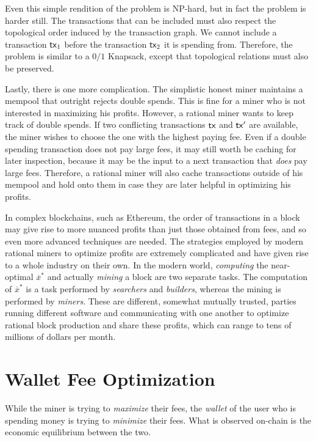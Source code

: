 Even this simple rendition of the problem is NP-hard, but in fact the problem is harder still.
The transactions that can be included must also respect the topological order induced by
the transaction graph. We cannot include a transaction $\mathsf{tx}_1$ before the transaction $\mathsf{tx}_2$
it is spending from. Therefore, the problem is similar to a $0/1$ Knapsack, except that
topological relations must also be preserved.

Lastly, there is one more complication. The simplistic honest miner maintains a mempool
that outright rejects double spends. This is fine for a miner who is not interested in
maximizing his profits. However, a rational miner wants to keep track of double spends.
If two conflicting transactions $\mathsf{tx}$ and $\mathsf{tx}'$ are available, the miner wishes to
choose the one with the highest paying fee. Even if a double spending transaction does
not pay large fees, it may still worth be caching for later inspection, because it may
be the input to a next transaction that \emph{does} pay large fees. Therefore, a rational
miner will also cache transactions outside of his mempool and hold onto them in case
they are later helpful in optimizing his profits.

In complex blockchains, such as Ethereum, the order of transactions in a block may give rise
to more nuanced profits than just those obtained from fees, and so even more advanced techniques
are needed. The strategies employed by modern rational miners to optimize profits are extremely
complicated and have given rise to a whole industry on their own. In the modern world,
\emph{computing} the near-optimal $\overline{x}^*$ and actually \emph{mining} a block
are two separate tasks. The computation of $\overline{x}^*$ is a task performed by
\emph{searchers} and \emph{builders}, whereas the mining is performed by \emph{miners}.
These are different, somewhat mutually trusted, parties running different software and
communicating with one another to optimize rational block production and share these
profits, which can range to tens of millions of dollars per month.

\section{Wallet Fee Optimization}

While the miner is trying to \emph{maximize} their fees, the \emph{wallet} of the user
who is spending money is trying to \emph{minimize} their fees. What is observed on-chain
is the economic equilibrium between the two.


